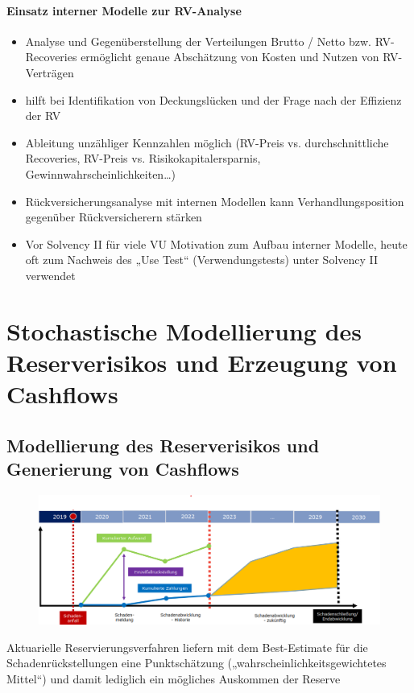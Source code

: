 \documentclass[12pt]{report}
\theoremstyle{dotless}
\theoremstyle{definition}
\begin{document}
\subsubsection{Einsatz interner Modelle zur RV-Analyse}
\begin{itemize}
\item Analyse und Gegenüberstellung der Verteilungen Brutto / Netto bzw. RV-Recoveries ermöglicht genaue Abschätzung von Kosten und Nutzen von RV-Verträgen
\item hilft bei Identifikation von Deckungslücken und der Frage nach der Effizienz der RV
\item  Ableitung unzähliger Kennzahlen möglich (RV-Preis vs. durchschnittliche Recoveries, RV-Preis vs. Risikokapitalersparnis, Gewinnwahrscheinlichkeiten…)
\item Rückversicherungsanalyse mit internen Modellen kann Verhandlungsposition gegenüber Rückversicherern stärken
\item Vor Solvency II für viele VU Motivation zum Aufbau interner Modelle, heute oft zum
Nachweis des „Use Test“ (Verwendungstests) unter Solvency II verwendet
\end{itemize}

\chapter{Stochastische Modellierung des Reserverisikos und Erzeugung von Cashflows}

\section{Modellierung des Reserverisikos und Generierung von Cashflows}
\begin{figure}[ht]
	\centering
	\includegraphics[width= \textwidth]{Bilder/Einzelschaden.png}
\end{figure}
Aktuarielle Reservierungsverfahren liefern mit dem Best-Estimate für die Schadenrückstellungen eine Punktschätzung („wahrscheinlichkeitsgewichtetes Mittel“) und damit lediglich ein mögliches Auskommen der Reserve
\end{document}

